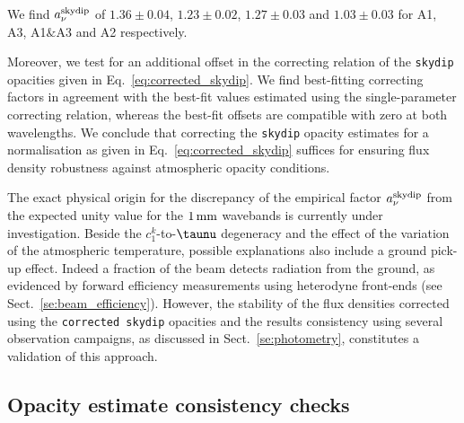 We find $a_\nu^{\rm{skydip}}$ of
$1.36 \pm 0.04$,
$1.23 \pm 0.02$,
$1.27 \pm 0.03$ and
$1.03 \pm 0.03$ for A1, A3, A1$\&$A3 and A2 respectively.

Moreover, we test for an additional offset in the
correcting relation of the {\tt skydip} opacities given in
Eq.~\ref{eq:corrected_skydip}. We find best-fitting correcting factors
in agreement with the best-fit values estimated using the single-parameter
correcting relation, whereas the best-fit offsets are compatible with
zero at both wavelengths. We conclude that correcting the {\tt skydip}
opacity estimates for a normalisation as given in
Eq.~\ref{eq:corrected_skydip} suffices for ensuring flux density
robustness against atmospheric opacity conditions.

The exact physical origin for the discrepancy of the empirical factor
$a_\nu^{\rm{skydip}}$ from the expected unity value {\lp for the
$1\,\rm{mm}$ wavebands} is currently under investigation.
{\lp Beside the $c_1^k$-to-$\taunu$ degeneracy and the effect
of the variation of the atmospheric temperature, possible explanations
also include a ground pick-up effect. Indeed a fraction of the beam
detects radiation from the ground, as evidenced by forward
efficiency measurements using heterodyne front-ends (see
Sect.~\ref{se:beam_efficiency}).}
However,
the stability of the flux densities corrected using the
{\tt corrected skydip} opacities {\lp and the results consistency using
several observation campaigns}, as discussed in
Sect.~\ref{se:photometry}, constitutes a validation of this approach.


\subsection{Opacity estimate consistency checks}
\label{se:opacity_tests}

